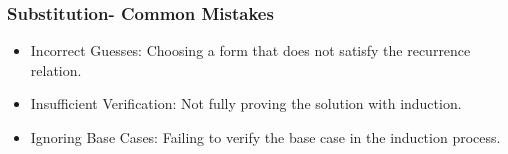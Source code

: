 

\begin{frame}
    \frametitle{Substitution- Common Mistakes}
    \vspace{0.4cm} %
     \begin{itemize}
        \item Incorrect Guesses: Choosing a form that does not satisfy the recurrence relation.
        \vspace{0.3cm} %
        \item Insufficient Verification: Not fully proving the solution with induction.
        \vspace{0.3cm}
        \item Ignoring Base Cases: Failing to verify the base case in the induction process.
    \end{itemize}



    \vspace{0.5cm} %
\end{frame}



